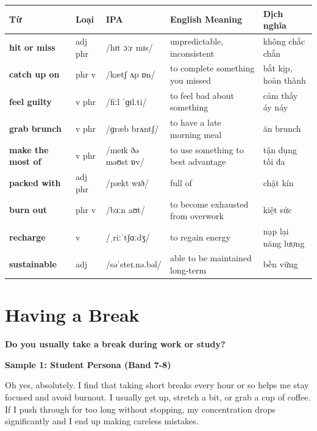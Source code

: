 \vspace{0.8em}
\begin{center}
\renewcommand{\arraystretch}{1.65}
\begin{tabularx}{\textwidth}{|V{0.22\textwidth}|C{0.07\textwidth}|I{0.20\textwidth}|Y|V{0.18\textwidth}|}
\hline
{}
\textbf{Từ} & \textbf{Loại} & \textbf{IPA} & \textbf{English Meaning} & \textbf{Dịch nghĩa} \\
\hline
\textbf{hit or miss} & adj phr & /hɪt ɔːr mɪs/ & unpredictable, inconsistent & không chắc chắn \\ \hline
\textbf{catch up on} & phr v & /kætʃ ʌp ɒn/ & to complete something you missed & bắt kịp, hoàn thành \\ \hline
\textbf{feel guilty} & v phr & /fiːl ˈɡɪl.ti/ & to feel bad about something & cảm thấy áy náy \\ \hline
\textbf{grab brunch} & v phr & /ɡræb brʌntʃ/ & to have a late morning meal & ăn brunch \\ \hline
\textbf{make the most of} & v phr & /meɪk ðə məʊst ɒv/ & to use something to best advantage & tận dụng tối đa \\ \hline
\textbf{packed with} & adj phr & /pækt wɪð/ & full of & chật kín \\ \hline
\textbf{burn out} & phr v & /bɜːn aʊt/ & to become exhausted from overwork & kiệt sức \\ \hline
\textbf{recharge} & v & /ˌriːˈtʃɑːdʒ/ & to regain energy & nạp lại năng lượng \\ \hline
\textbf{sustainable} & adj & /səˈsteɪ.nə.bəl/ & able to be maintained long-term & bền vững \\ \hline
\end{tabularx}
\end{center}

\newpage

\section{Having a Break}
\begin{ieltsquestion}
\textbf{Do you usually take a break during work or study?}
\end{ieltsquestion}
\textbf{Sample 1: Student Persona (Band 7-8)}

Oh yes, absolutely. I find that taking short breaks every hour or so helps me stay focused and avoid burnout. I usually get up, stretch a bit, or grab a cup of coffee. If I push through for too long without stopping, my concentration drops significantly and I end up making careless mistakes.

